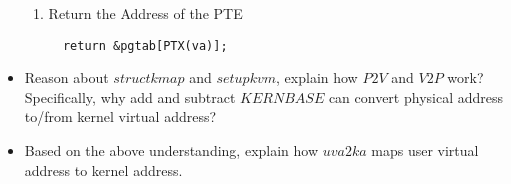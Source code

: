 \documentclass{article}
\begin{document}
\begin{itemize}
\begin{enumerate}
\item Return the Address of the PTE
  \begin{verbatim}
  return &pgtab[PTX(va)];
  \end{verbatim}

    \end{enumerate}

  \item Reason about $struct kmap$ and $setupkvm$,
    explain how $P2V$ and $V2P$ work?
    Specifically, why add and subtract $KERNBASE$ can convert physical address
    to/from kernel virtual address?
  \item Based on the above understanding, explain how $uva2ka$ maps user
    virtual address to kernel address.
\end{itemize}
\end{document}
